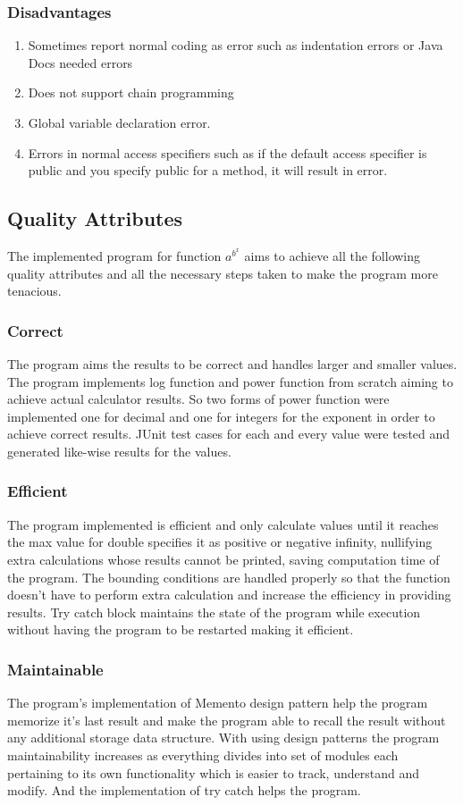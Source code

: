 \documentclass[a4paper, 11pt]{article}
\begin{document}
\subsubsection{Disadvantages}
\begin{enumerate}
    \item Sometimes report normal coding as error such as indentation errors or Java Docs needed errors
    \item Does not support chain programming
    \item Global variable declaration error.
    \item Errors in normal access specifiers such as if the default access specifier is public and you specify public for a method, it will result in error.
\end{enumerate}

\newpage
\subsection{Quality Attributes}
The implemented program for function $a^{b^x}$ aims to achieve all the following quality attributes and all the necessary steps taken to make the program more tenacious.
\subsubsection{Correct}
The program aims the results to be correct and handles larger and smaller values. The program implements log function and power function from scratch aiming to achieve actual calculator results. So two forms of power function were implemented one for decimal and one for integers for the exponent in order to achieve correct results. JUnit test cases for each and every value were tested and generated like-wise results for the values. 
\subsubsection{Efficient}
The program implemented is efficient and only calculate values until it reaches the max value for double specifies it as positive or negative infinity, nullifying extra calculations whose results cannot be printed, saving computation time of the program. The bounding conditions are handled properly so that the function doesn't have to perform extra calculation and increase the efficiency in providing results.  Try catch block maintains the state of the program while execution without having the program to be restarted making it efficient.
\subsubsection{Maintainable}
The program's implementation of Memento design pattern help the program memorize it's last result and make the program able to recall the result without any additional storage data structure. With using design patterns the program maintainability increases as everything divides into set of modules each pertaining to its own functionality which is easier to track, understand and modify. And the implementation of try catch helps the program.
\end{document}
